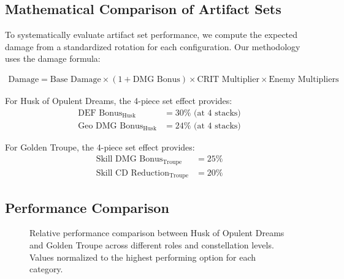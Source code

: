 \documentclass[12pt,a4paper]{article}
\begin{document}
\subsection{Mathematical Comparison of Artifact Sets}

To systematically evaluate artifact set performance, we compute the expected damage from a standardized rotation for each configuration. Our methodology uses the damage formula:

\begin{align}
\text{Damage} = \text{Base Damage} \times (1 + \text{DMG Bonus}) \times \text{CRIT Multiplier} \times \text{Enemy Multipliers}
\end{align}

For Husk of Opulent Dreams, the 4-piece set effect provides:
\begin{align}
\text{DEF Bonus}_{\text{Husk}} &= 30\% \text{ (at 4 stacks)} \\
\text{Geo DMG Bonus}_{\text{Husk}} &= 24\% \text{ (at 4 stacks)}
\end{align}

For Golden Troupe, the 4-piece set effect provides:
\begin{align}
\text{Skill DMG Bonus}_{\text{Troupe}} &= 25\% \\
\text{Skill CD Reduction}_{\text{Troupe}} &= 20\%
\end{align}

\subsection{Performance Comparison}

\begin{figure}[H]
\centering
{}
\caption{Relative performance comparison between Husk of Opulent Dreams and Golden Troupe across different roles and constellation levels. Values normalized to the highest performing option for each category.}
\label{fig:artifact_comparison}
\end{figure}
\end{document}

